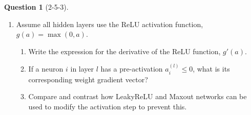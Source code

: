 \documentclass[12pt]{article}
\newif\ifsolution
\theoremstyle{definition}
\newtheorem{exercise}{Question}%
\newtheorem{answer}{Answer} %
\newcommand{\Answer}[1]{
\ifsolution\color{answer}\begin{answer}#1\end{answer}\fi
}
\newif\ifsolution
\newcommand{\vect}[1]{\bm{#1}}
\begin{document}
\begin{exercise}[2-5-3]
{\begin{enumerate}
    \item Assume all hidden layers use the ReLU activation function, $g(a) = \max(0, a)$.
    \begin{enumerate}
        \item Write the expression for the derivative of the ReLU function, $g'(a)$.
        \item If a neuron $i$ in layer $l$ has a pre-activation $a_i^{(l)} \leq 0$, what is its corresponding weight gradient vector?
        \item Compare and contrast how LeakyReLU and Maxout networks can be used to modify the activation step to prevent this.
    \end{enumerate}
\end{enumerate}

}

\newpage

\Answer{
\begin{enumerate}[label=\textbf{(\arabic*)}, leftmargin=*]
    \item \textbf{Identity activations.}
    \begin{enumerate}[label=\textbf{(\alph*)}, leftmargin=*]
        \item With identity activations,
        $\vect{h}^{(l)}=W^{(l)}\vect{h}^{(l-1)}+\vect{b}^{(l)}$.
        The next layer's pre-activation is
        \begin{align*}
            \vect{a}^{(l+1)}
                &= W^{(l+1)}\vect{h}^{(l)}+\vect{b}^{(l+1)}\\
                &= W^{(l+1)}\left(W^{(l)}\vect{h}^{(l-1)}
                   +\vect{b}^{(l)}\right)+\vect{b}^{(l+1)}\\
                &= \left(W^{(l+1)}W^{(l)}\right)\vect{h}^{(l-1)}
                   +\left(W^{(l+1)}\vect{b}^{(l)}+\vect{b}^{(l+1)}\right).
        \end{align*}
        Thus the composition is a single affine transformation with
        \[
            \boxed{\widetilde W=W^{(l+1)}W^{(l)},\qquad
            \widetilde{\vect{b}}=W^{(l+1)}\vect{b}^{(l)}+\vect{b}^{(l+1)}}.
        \]
        If layer $l+1$ is hidden, its identity activation leaves this map unchanged.

        \item Repeatedly applying part (a), the layers collapse into a single
        affine map from input to logits. Keeping the final softmax unchanged
        gives the same class probabilities. Thus the multilayer network has
        no greater representational capacity than a single-layer linear classifier.
    \end{enumerate}


\end{enumerate}}
\end{exercise}
\end{document}
